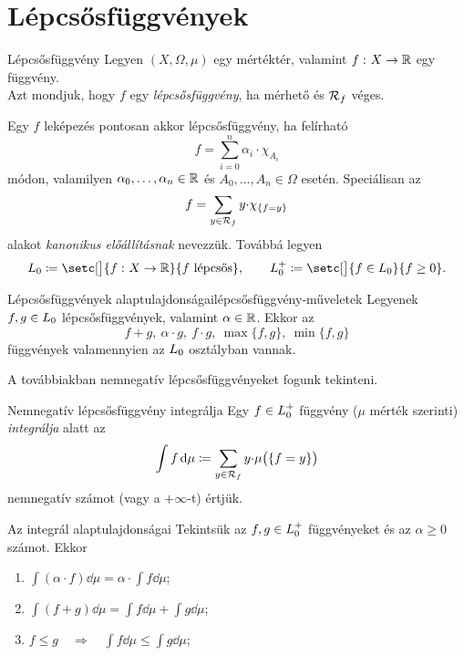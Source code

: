 \documentclass[
]{elteikthesis}[2024/04/26]
\begin{document}
	\newpage
	\section{Lépcsősfüggvények}
	
	\begin{definition}{Lépcsősfüggvény}{}
		Legyen \( (X, \Omega, \mu) \) egy mértéktér, 
		valamint \( f \,\colon X \to \mathbb{R} \) egy függvény.\\[6pt]
		Azt mondjuk, hogy \( f \) egy \emph{lépcsősfüggvény}, 
		ha mérhető és \( \mathcal{R}_{f} \) véges.
	\end{definition}
	
	\vspace{6pt}
	\noindent
	Egy \( f \) leképezés pontosan akkor lépcsősfüggvény, ha felírható
	\[
		f = \sum_{i=0}^{n} \alpha_i {\cdot} \chi_{A_i}
	\]
	módon, 
	valamilyen \( \alpha_0, \dots, \alpha_n \in \mathbb{R} \) 
	és \( A_0, \dots, A_n \in \Omega \) esetén.
	Speciálisan az
	\[
		f = \sum_{y \in \mathcal{R}_{f}} y {\cdot} \chi_{\{ f = y \}}
	\]
	alakot \emph{kanonikus előállításnak} nevezzük. Továbbá legyen
	\[
		\StepFunc \coloneq \setc[\big]{ \func{f}{X}{\R} }{ f \text{ lépcsős}}, \qquad
		\StepFuncPos \coloneq \setc[\big]{ f \in \StepFunc }{ f \geq 0 }. 
	\]
	
	\begin{statement}{Lépcsősfüggvények alaptulajdonságai}{lépcsősfüggvény-műveletek}
		Legyenek \( f,g \in \StepFunc \) lépcsősfüggvények, valamint \( \alpha \in \mathbb{R} \). Ekkor az
		\[
			f + g, \ \alpha \cdot g, \ f \cdot g, \ \max\{ f, g \}, \ \min\{ f, g \}
		\]
		függvények valamennyien az \( \StepFunc \) osztályban vannak.
	\end{statement}
	
	\vspace{6pt}
	\noindent
	A továbbiakban nemnegatív lépcsősfüggvényeket fogunk tekinteni.
	
	\begin{definition}{Nemnegatív lépcsősfüggvény integrálja}{}
		Egy \( f \in \StepFuncPos \) függvény (\( \mu \) mérték szerinti) 
		\emph{integrálja} alatt az
		\[
			\int f \mathop{}\!\mathrm{d}{\mu} \coloneq
			\sum_{y \in \mathcal{R}_{f}} y {\cdot} \mu \bigl( \{ f = y \} \bigr)
		\]
		nemnegatív számot (vagy a \( +\infty \)-t) értjük.
	\end{definition}
	
	\begin{theorem}{Az integrál alaptulajdonságai}{}
		Tekintsük az \( f, g \in \StepFuncPos \) függvényeket és az \( \alpha \geq 0 \) számot. Ekkor
		\begin{enumerate}
			\item \( \displaystyle \int (\alpha \cdot f) \dd{\mu} = \alpha \cdot \int f \dd{\mu} \);
			\item \( \displaystyle \int (f + g) \dd{\mu} = \int f \dd{\mu} + \int g \dd{\mu} \);
			\item \( \displaystyle f \leq g \quad \Longrightarrow \quad \int f \dd{\mu} \leq \int g \dd{\mu} \);
		\end{enumerate}
	\end{theorem}

	
\end{document}
